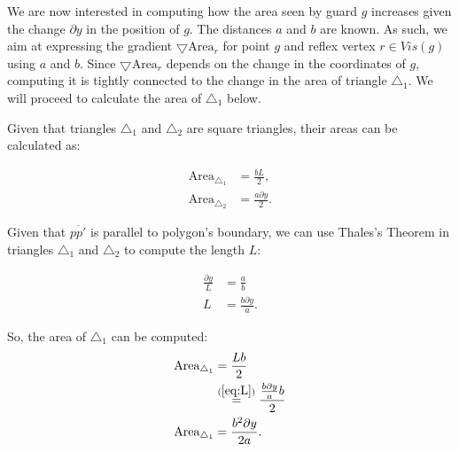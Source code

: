 

We are now interested in computing how the area seen by guard $g$ increases given the change $\partial y$ in the position of $g$. The distances $a$ and $b$ are known. As such, we aim at expressing the gradient $\bigtriangledown \text{Area}_r$ for point $g$ and reflex vertex $r \in Vis(g)$ using $a$ and $b$. Since $\bigtriangledown \text{Area}_r$ depends on the change in the coordinates of $g$, computing it is tightly connected to the change in the area of triangle $\triangle_1$. We will proceed to calculate the area of $\triangle_1$ below.

Given that triangles $\triangle_1$ and $\triangle_2$ are square triangles, their areas can be calculated as:

\begin{align*}
    \text{Area}_{\triangle_1} &= \frac{b L}{2},\\ 
    \text{Area}_{\triangle_2} &= \frac{a \partial y}{2}.
\end{align*}


Given that $\overline{pp'}$ is parallel to polygon's boundary, we can use Thales's Theorem in triangles $\triangle_1$ and $\triangle_2$ to compute the length $L$: 

\begin{align}
    \frac{\partial y}{L} &= \frac a b \\
    L &= \frac{b \partial y}{a}. \label{eq:L}
\end{align}

So, the area of $\triangle_1$ can be computed:
\begin{align}
    \text{Area}_{\triangle_1} &= \frac{Lb}{2} \\
    &\overset{(\ref{eq:L})}{=} \frac{\frac{b \partial y}{a}b}{2} \\
    \text{Area}_{\triangle_1} &= \frac{b^2 \partial y}{2a}. \label{eq:ardd}
\end{align}

